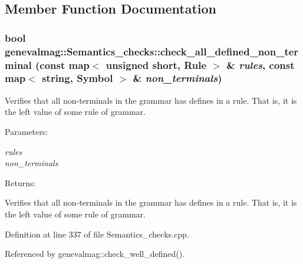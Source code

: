 \subsection{Member Function Documentation}
\hypertarget{classgenevalmag_1_1Semantics__checks_bb0a26862b6134eeb10f55b701ded180}{
\subsubsection[{check\_\-all\_\-defined\_\-non\_\-terminal}]{\setlength{\rightskip}{0pt plus 5cm}bool genevalmag::Semantics\_\-checks::check\_\-all\_\-defined\_\-non\_\-terminal (const map$<$ unsigned short, {\bf Rule} $>$ \& {\em rules}, \/  const map$<$ string, {\bf Symbol} $>$ \& {\em non\_\-terminals})}}
\label{classgenevalmag_1_1Semantics__checks_bb0a26862b6134eeb10f55b701ded180}


Verifies that all non-terminals in the grammar has defines in a rule. That is, it is the left value of some rule of grammar.

\begin{Desc}
\item[Parameters:]
\begin{description}
\item[{\em rules}]\item[{\em non\_\-terminals}]\end{description}
\end{Desc}
\begin{Desc}
\item[Returns:]\end{Desc}
Verifies that all non-terminals in the grammar has defines in a rule. That is, it is the left value of some rule of grammar. 

Definition at line 337 of file Semantics\_\-checks.cpp.

Referenced by genevalmag::check\_\-well\_\-defined().

